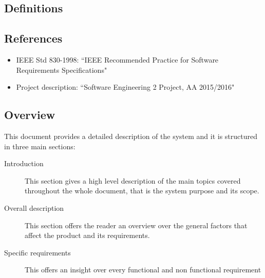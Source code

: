 \documentclass[12pt, a4paper]{article}
\begin{document}

\subsection{Definitions}

\subsection{References}
\begin{itemize}
\item IEEE Std 830-1998: ``IEEE Recommended Practice for Software Requirements Specifications"
\item Project description: ``Software Engineering 2 Project, AA 2015/2016"
\end{itemize}


\subsection{Overview}
This document provides a detailed description of the system and it is structured in three main sections:

\begin{description}
  \item[Introduction] This section gives a high level description of the main topics covered throughout the whole document, that is the system purpose and its scope.
  \item[Overall description] This section offers the reader an overview over the general factors that affect the product and its requirements.
  \item[Specific requirements] This offers an insight over every functional and non functional requirement
\end{description}
\end{document}
